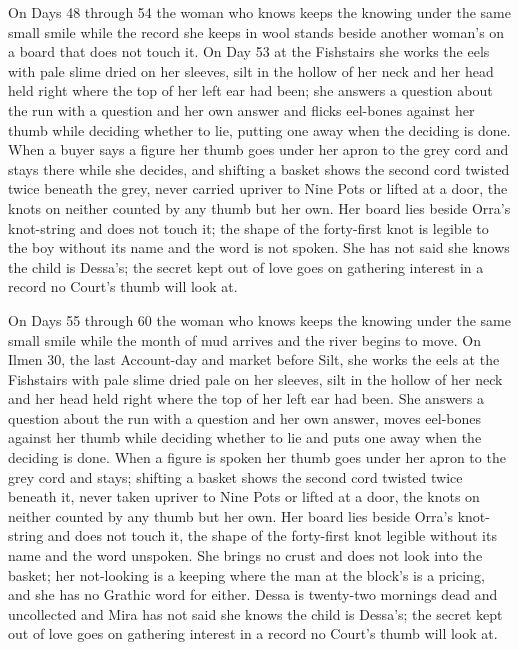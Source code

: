 \documentclass{design/chronicle}
\begin{document}
{On Days 48 through 54 the woman who knows keeps the knowing under the same small smile while the record she keeps in wool stands beside another woman’s on a board that does not touch it. On Day 53 at the Fishstairs she works the eels with pale slime dried on her sleeves, silt in the hollow of her neck and her head held right where the top of her left ear had been; she answers a question about the run with a question and her own answer and flicks eel-bones against her thumb while deciding whether to lie, putting one away when the deciding is done. When a buyer says a figure her thumb goes under her apron to the grey cord and stays there while she decides, and shifting a basket shows the second cord twisted twice beneath the grey, never carried upriver to Nine Pots or lifted at a door, the knots on neither counted by any thumb but her own. Her board lies beside Orra’s knot-string and does not touch it; the shape of the forty-first knot is legible to the boy without its name and the word is not spoken. She has not said she knows the child is Dessa’s; the secret kept out of love goes on gathering interest in a record no Court’s thumb will look at.

On Days 55 through 60 the woman who knows keeps the knowing under the same small smile while the month of mud arrives and the river begins to move. On Ilmen 30, the last Account-day and market before Silt, she works the eels at the Fishstairs with pale slime dried pale on her sleeves, silt in the hollow of her neck and her head held right where the top of her left ear had been. She answers a question about the run with a question and her own answer, moves eel-bones against her thumb while deciding whether to lie and puts one away when the deciding is done. When a figure is spoken her thumb goes under her apron to the grey cord and stays; shifting a basket shows the second cord twisted twice beneath it, never taken upriver to Nine Pots or lifted at a door, the knots on neither counted by any thumb but her own. Her board lies beside Orra’s knot-string and does not touch it, the shape of the forty-first knot legible without its name and the word unspoken. She brings no crust and does not look into the basket; her not-looking is a keeping where the man at the block’s is a pricing, and she has no Grathic word for either. Dessa is twenty-two mornings dead and uncollected and Mira has not said she knows the child is Dessa’s; the secret kept out of love goes on gathering interest in a record no Court’s thumb will look at.

}
\end{document}
